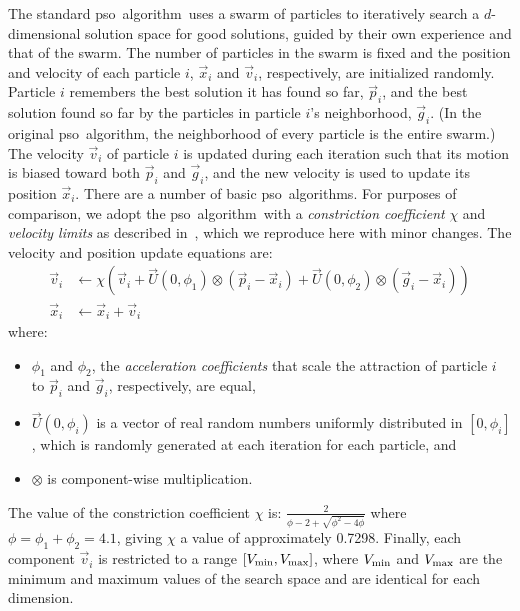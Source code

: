 \documentclass[a4paper,twoside]{article}
\newcommand{\pso}{{\sc pso}}
\newcommand{\alg}{algorithm}
\newcommand{\algs}{algorithms}
\begin{document}
The standard \pso\ \alg\ uses a swarm of particles to iteratively search a $d$-dimensional solution space for good solutions, guided by their own experience and that of the swarm. The number of particles in the swarm is fixed and the position and velocity of each particle $i$, $\vec{x}_{i}$ and $\vec{v}_{i}$, respectively, are initialized randomly.  Particle $i$ remembers the best solution it has found so far, $\vec{p}_{i}$, and the best solution found so far by the particles in particle $i$'s neighborhood, $\vec{g}_{i}$. (In the original \pso\ \alg, the neighborhood of every particle is the entire swarm.) The velocity $\vec{v}_{i}$ of particle $i$ is updated during each iteration such that its motion is biased toward both $\vec{p}_{i}$ and $\vec{g}_{i}$, and the new velocity is used to update its position $\vec{x}_{i}$.  There are a number of basic \pso\ \algs.  For purposes of comparison, we adopt the \pso\ \alg\ with a \emph{constriction coefficient} $\chi$ and \emph{velocity limits} as described in~\cite{poli07}, which we reproduce here with minor changes.  The velocity and position update equations are:
\begin{align} 
\label{pso-update-eqs}
    \vec{v}_{i} & \leftarrow \chi ( \vec{v}_{i} + \vec{U}(0,\phi_{1}) \otimes (\vec{p}_{i} - \vec{x}_{i}) + \vec{U}(0,\phi_{2}) \otimes (\vec{g}_{i} - \vec{x}_{i}))  \\ 
\vec{x}_{i}    & \leftarrow \vec{x}_{i} + \vec{v}_{i} 
\end{align} 
where:
\begin{itemize}
\item
$\phi_1$ and $\phi_2$, the \emph{acceleration coefficients} that scale the attraction of particle $i$ to $\vec{p}_{i}$ and $\vec{g}_{i}$, respectively, are equal,
\item
$\vec{U}(0,\phi_{i})$ is a vector of real random numbers uniformly distributed in $[0,\phi_{i}]$, which is randomly generated at each iteration for each particle, and
\item
$\otimes$ is component-wise multiplication.
\end{itemize}
The value of the constriction coefficient $\chi$ is:
$\frac{2}{\phi - 2 + \sqrt{\phi^{2} - 4 \phi}}$
where $\phi = \phi_1 + \phi_2 = 4.1$, giving $\chi$ a value of approximately 0.7298.
Finally, each component $\vec{v}_{i}$ is restricted to a range $[V_{\mbox{\scriptsize min}}, V_{\mbox{\scriptsize max}}]$, where $V_{\mbox{\scriptsize min}}$ and $V_{\mbox{\scriptsize max}}$ are the minimum and maximum values of the search space and are identical for each dimension. 
\end{document}
